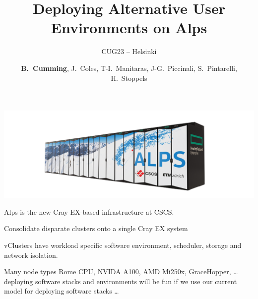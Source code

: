 \documentclass[aspectratio=43]{beamer}
\author{
    \textbf{B.~Cumming},
    J.~Coles,
    T-I.~Manitaras,
    J-G.~Piccinali,
    S.~Pintarelli,
    H.~Stoppels}
\title{\centering Deploying Alternative User Environments on Alps}
\subtitle{CUG23 -- Helsinki}
\begin{document}
\setlength{}
\setlength\leftmargini{\dimexpr\leftmargini - 1.0em\relax}

\cscstitle

\begin{frame}[fragile]{}
    \vspace{-60pt}
    \begin{center}
    \includegraphics[width=\textwidth]{images/alps.png}

    Alps is the new Cray EX-based infrastructure at CSCS.

    \vspace{15pt}

    Consolidate disparate clusters onto a single Cray EX system

    \vspace{15pt}

    vClusters have workload specific software environment, scheduler, storage and network isolation.

    \vspace{15pt}

    Many node types  Rome CPU, NVIDA A100, AMD Mi250x, GraceHopper, \dots deploying software stacks and environments will be fun if we use our current model for deploying software stacks \dots

    \end{center}

\end{frame}
\end{document}
